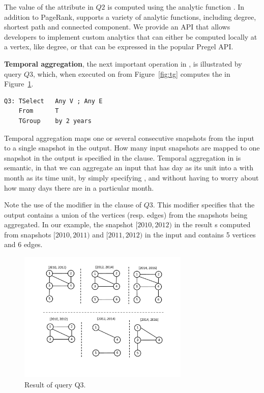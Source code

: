 The value of the attribute  in $Q2$ is computed using the
analytic function .  In addition to PageRank, \ql
supports a variety of analytic functions, including degree, shortest
path and connected component.  We provide an API that allows
developers to implement custom analytics that can either be computed
locally at a vertex, like degree, or that can be expressed in the
popular Pregel API. 

{\bf Temporal aggregation}, the next important operation in \ql, is
illustrated by query $Q3$, which, when executed on  from
Figure~\ref{fig:tg} computes the \tg in Figure~\ref{fig:tg_any}.

\begin{verbatim}
Q3: TSelect   Any V ; Any E 
    From      T
    TGroup    by 2 years
\end{verbatim}


Temporal aggregation maps one or several consecutive snapshots from
the input to a single snapshot in the output.  How many input
snapshots are mapped to one snapshot in the output is specified in the
 clause.  Temporal aggregation in \ql is semantic, in
that we can aggregate an input \tg that has day as its unit into a \tg
with month as its time unit, by simply specifying , and without having to worry about how many days there are in
a particular month.

Note the use of the modifier  in the  clause
of $Q3$.  This modifier specifies that the output contains a union of
the vertices (resp. edges) from the snapshots being aggregated.  In
our example, the snapshot $[2010, 2012)$ in the result s computed from
  snapshots $[2010, 2011)$ and $[2011, 2012)$ in the input and
      contains 5 vertices and 6 edges.

\begin{figure}
\includegraphics[width=3.2in]{figs/TGroupAny.pdf}
\caption{Result of query Q3.}
\label{fig:tg_any}
\end{figure}

